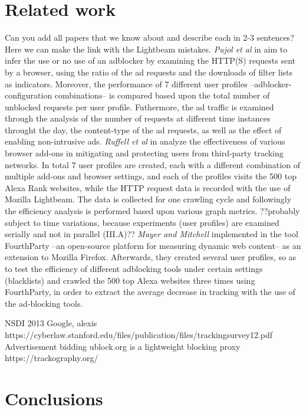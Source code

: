 \documentclass{sig-alternate}
\begin{document}
\section{Related work}
{\color{red}Can you add all papers that we know about and describe each in 2-3 sentences? Here we can make the link with the Lightbeam mistakes.}
{\color{blue}
\textit{Pujol et al} in \cite{pujol} aim to infer the use or no use of an adblocker by examining the HTTP(S) requests sent by a browser, using the ratio of the ad requests and the downloads of filter lists as indicators. Moreover, the performance of 7 different user profiles --adblocker-configuration combinations-- is compared based upon the total number of unblocked requests per user profile. Futhermore, the ad traffic is examined through the analysis of the number of requests at different time instances throught the day, the content-type of the ad requests, as well as the effect of enabling non-intrusive ads.
\textit{Ruffell et al} in \cite{ruffel2015} analyze the effectiveness of various browser add-ons in mitigating and protecting users from third-party tracking networks. In total 7 user profiles are created, each with a different combination of multiple add-ons and browser settings, and each of the profiles visits the 500 top Alexa Rank websites, while the HTTP request data is recorded with the use of Mozilla Lightbeam. The data is collected for one crawling cycle and followingly the efficiency analysis is performed based upon various graph metrics. ??probably subject to time variations, because experiments (user profiles) are examined serially and not in parallel (III.A)??
\textit{Mayer and Mitchell} implemented in \cite{mayer} the tool FourthParty --an open-source platform for measuring dynamic web content-- as an extension to Mozilla Firefox. Afterwards, they created several user profiles, so as to test the efficiency of different adblocking tools under certain settings (blacklists) and crawled the 500 top Alexa websites three times using FourthParty, in order to extract the average decrease in tracking with the use of the ad-blocking tools.
}

NSDI 2013 Google, alexis
https://cyberlaw.stanford.edu/files/publication/files/trackingsurvey12.pdf
Advertisement bidding
ublock.org is a lightweight blocking proxy
https://trackography.org/

\section{Conclusions} \label{sec:conclusions}



\end{document}
